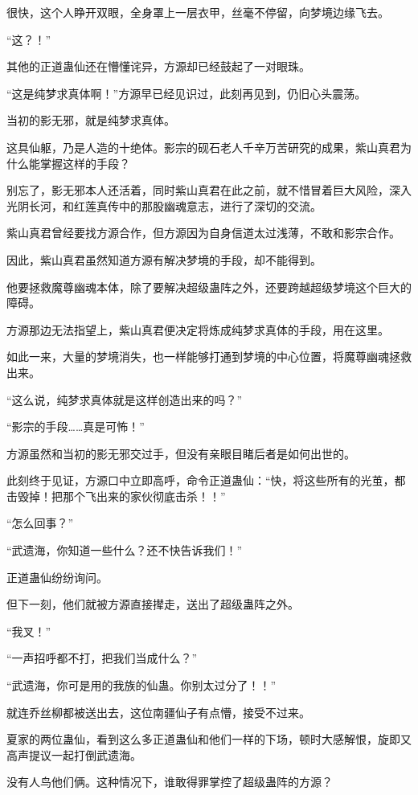 \begin{this_body}
很快，这个人睁开双眼，全身罩上一层衣甲，丝毫不停留，向梦境边缘飞去。

“这？！”

其他的正道蛊仙还在懵懂诧异，方源却已经鼓起了一对眼珠。

“这是纯梦求真体啊！”方源早已经见识过，此刻再见到，仍旧心头震荡。

当初的影无邪，就是纯梦求真体。

这具仙躯，乃是人造的十绝体。影宗的砚石老人千辛万苦研究的成果，紫山真君为什么能掌握这样的手段？

别忘了，影无邪本人还活着，同时紫山真君在此之前，就不惜冒着巨大风险，深入光阴长河，和红莲真传中的那股幽魂意志，进行了深切的交流。

紫山真君曾经要找方源合作，但方源因为自身信道太过浅薄，不敢和影宗合作。

因此，紫山真君虽然知道方源有解决梦境的手段，却不能得到。

他要拯救魔尊幽魂本体，除了要解决超级蛊阵之外，还要跨越超级梦境这个巨大的障碍。

方源那边无法指望上，紫山真君便决定将炼成纯梦求真体的手段，用在这里。

如此一来，大量的梦境消失，也一样能够打通到梦境的中心位置，将魔尊幽魂拯救出来。

“这么说，纯梦求真体就是这样创造出来的吗？”

“影宗的手段……真是可怖！”

方源虽然和当初的影无邪交过手，但没有亲眼目睹后者是如何出世的。

此刻终于见证，方源口中立即高呼，命令正道蛊仙：“快，将这些所有的光茧，都击毁掉！把那个飞出来的家伙彻底击杀！！”

“怎么回事？”

“武遗海，你知道一些什么？还不快告诉我们！”

正道蛊仙纷纷询问。

但下一刻，他们就被方源直接撵走，送出了超级蛊阵之外。

“我叉！”

“一声招呼都不打，把我们当成什么？”

“武遗海，你可是用的我族的仙蛊。你别太过分了！！”

就连乔丝柳都被送出去，这位南疆仙子有点懵，接受不过来。

夏家的两位蛊仙，看到这么多正道蛊仙和他们一样的下场，顿时大感解恨，旋即又高声提议一起打倒武遗海。

没有人鸟他们俩。这种情况下，谁敢得罪掌控了超级蛊阵的方源？


\end{this_body}
